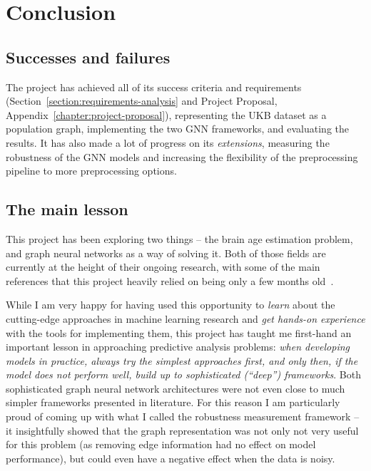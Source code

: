 \chapter{Conclusion}



\section{Successes and failures}

The project has achieved all of its success criteria and requirements (Section~\ref{section:requirements-analysis} and Project Proposal, Appendix~\ref{chapter:project-proposal}), representing the UKB dataset as a population graph, implementing the two GNN frameworks, and evaluating the results. It has also made a lot of progress on its \textit{extensions}, measuring the robustness of the GNN models and increasing the flexibility of the preprocessing pipeline to more preprocessing options.

\section{The main lesson}
This project has been exploring two things – the brain age estimation problem, and graph neural networks as a way of solving it. Both of those fields are currently at the height of their ongoing research, with some of the main references that this project heavily relied on being only a few months old~\cite{kaufmann2019, niu2019improved, pervaiz2020optimising}.

While I am very happy for having used this opportunity to \textit{learn} about the cutting-edge approaches in machine learning research and \textit{get hands-on experience} with the tools for implementing them, this project has taught me first-hand an important lesson in approaching predictive analysis problems: \textit{when developing models in practice, always try the simplest approaches first, and only then, if the model does not perform well, build up to sophisticated (``deep'') frameworks}. Both sophisticated graph neural network architectures were not even close to much simpler frameworks presented in literature. For this reason I am particularly proud of coming up with what I called the robustness measurement framework – it insightfully showed that the graph representation was not only not very useful for this problem (as removing edge information had no effect on model performance), but could even have a negative effect when the data is noisy.

